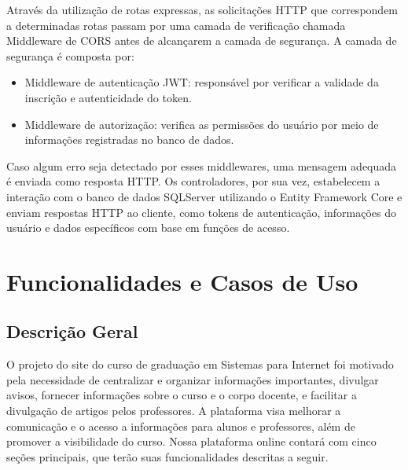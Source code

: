 \documentclass[a4paper,12pt]{report}
\begin{document}
Através da utilização de rotas expressas, as solicitações HTTP que correspondem a determinadas rotas passam por uma camada de verificação chamada Middleware de CORS antes de alcançarem a camada de segurança. 
A camada de segurança é composta por: 
\begin{itemize} 
  \item Middleware de autenticação JWT: responsável por verificar a validade da inscrição e autenticidade do token. 
  \item Middleware de autorização: verifica as permissões do usuário por meio de informações registradas no banco de dados. 
\end{itemize} 
Caso algum erro seja detectado por esses middlewares, uma mensagem adequada é enviada como resposta HTTP. 
Os controladores, por sua vez, estabelecem a interação com o banco de dados SQLServer utilizando o Entity Framework Core e enviam respostas HTTP ao cliente, como tokens de autenticação, informações do usuário e dados específicos com base em funções de acesso. 

\section{Funcionalidades e Casos de Uso}
 \subsection{Descrição Geral}
    \label{sec:descricao}
O projeto do site do curso de graduação em Sistemas para Internet foi motivado pela necessidade de centralizar e organizar informações importantes, divulgar avisos, fornecer informações sobre o curso e o corpo docente, e facilitar a divulgação de artigos pelos professores. A plataforma visa melhorar a comunicação e o acesso a informações para alunos e professores, além de promover a visibilidade do curso.
Nossa plataforma online contará com cinco seções principais, que terão suas funcionalidades descritas a seguir.
 
\end{document}
